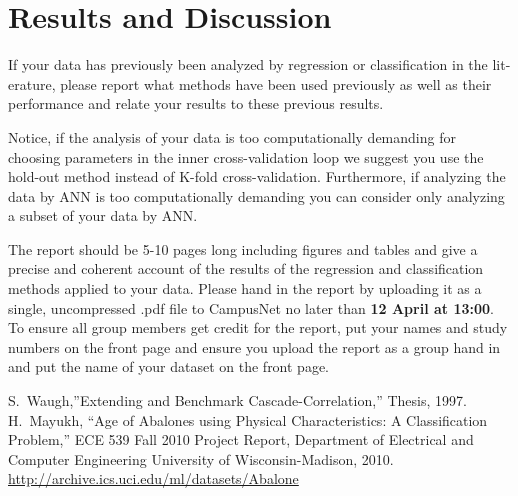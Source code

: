\documentclass[10pt, paper=a4]{article}
\begin{document}


\section{Results and Discussion}
\label{sec:results_and_discussion}
If your data has previously been analyzed by regression or
classification in the lit- erature, please report what methods have
been used previously as well as their performance and relate your
results to these previous results.

Notice, if the analysis of your data is too computationally demanding
for choosing parameters in the inner cross-validation loop we suggest
you use the hold-out method instead of K-fold
cross-validation. Furthermore, if analyzing the data by ANN is too
computationally demanding you can consider only analyzing a subset of
your data by ANN.

The report should be 5-10 pages long including figures and tables and
give a precise and coherent account of the results of the regression
and classification methods applied to your data. Please hand in the
report by uploading it as a single, uncompressed .pdf file to
CampusNet no later than {\bf 12 April at 13:00}.  To ensure all group
members get credit for the report, put your names and study numbers on
the front page and ensure you upload the report as a group hand in and
put the name of your dataset on the front page.
\begin{thebibliography}{99}
	 S.~Waugh,''Extending and Benchmark
  	Cascade-Correlation,'' Thesis, 1997.
	 H.~Mayukh, ``Age of Abalones using Physical
    Characteristics: A Classification Problem,'' ECE 539 Fall 2010
    Project Report, Department of Electrical and Computer Engineering
    University of Wisconsin-Madison, 2010.
     \url{http://archive.ics.uci.edu/ml/datasets/Abalone}
    
\end{thebibliography}
\end{document}
